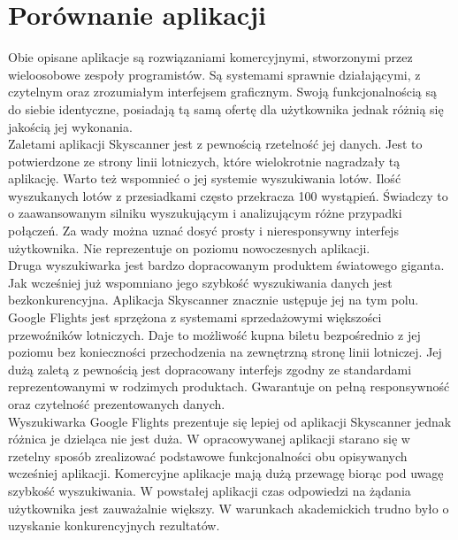 \documentclass[12pt, twoside]{report}
\begin{document}
\section{Porównanie aplikacji}
Obie opisane aplikacje są rozwiązaniami komercyjnymi, stworzonymi przez wieloosobowe zespoły programistów. Są systemami sprawnie działającymi, z czytelnym oraz zrozumiałym interfejsem graficznym. Swoją funkcjonalnością są do siebie identyczne, posiadają tą samą ofertę dla użytkownika jednak różnią się jakością jej wykonania. \\ \indent
Zaletami aplikacji Skyscanner jest z pewnością rzetelność jej danych. Jest to potwierdzone ze strony linii lotniczych, które wielokrotnie nagradzały tą aplikację. Warto też wspomnieć o jej systemie wyszukiwania lotów. Ilość wyszukanych lotów z przesiadkami często przekracza 100 wystąpień. Świadczy to o zaawansowanym silniku wyszukującym i analizującym różne przypadki połączeń. Za wady można uznać dosyć prosty i nieresponsywny interfejs użytkownika. Nie reprezentuje on poziomu nowoczesnych aplikacji. \\ \indent
Druga wyszukiwarka jest bardzo dopracowanym produktem światowego giganta. Jak wcześniej już wspomniano jego szybkość wyszukiwania danych jest bezkonkurencyjna. Aplikacja Skyscanner znacznie ustępuje jej na tym polu. Google Flights jest sprzężona z systemami sprzedażowymi większości przewoźników lotniczych. Daje to możliwość kupna biletu bezpośrednio z jej poziomu bez konieczności przechodzenia na zewnętrzną stronę linii lotniczej. Jej dużą zaletą z pewnością jest dopracowany interfejs zgodny ze standardami reprezentowanymi w rodzimych produktach. Gwarantuje on pełną responsywność oraz czytelność prezentowanych danych. \\ \indent
Wyszukiwarka Google Flights prezentuje się lepiej od aplikacji Skyscanner jednak różnica je dzieląca nie jest duża. W opracowywanej aplikacji starano się w rzetelny sposób zrealizować podstawowe funkcjonalności obu opisywanych wcześniej aplikacji. Komercyjne aplikacje mają dużą przewagę biorąc pod uwagę szybkość wyszukiwania. W powstałej aplikacji czas odpowiedzi na żądania użytkownika jest zauważalnie większy. W warunkach akademickich trudno było o uzyskanie konkurencyjnych rezultatów.
\newpage
\end{document}
